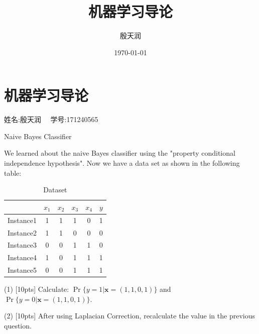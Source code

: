 \documentclass[11pt, a4paper, UTF8]{ctexart}
\title{机器学习导论}
\author{殷天润}
\date{\today}
\begin{document}
                                                                                                                

\section {机器学习导论}

\begin{center} 姓名:殷天润 ~~学号:171240565\end{center}
\begin{problem}[ML problem 1]
	[20pts] Naive Bayes Classifier

		
	We learned about the naive Bayes classifier using the "property conditional independence hypothesis". Now we have a data set as shown in the following table:
	\begin{table}[htp]
		\centering
		\caption{Dataset}\label{tab:aStrangeTable}
	\begin{tabular}{c|ccccc}
		\hline 
		& $x_1$ & $x_2$ & $x_3$ & $x_4$ & $y$ \\ 
		\hline 
	Instance1	& 1 & 1 & 1 & 0 & 1 \\ 
		\hline 
	Instance2	& 1 & 1 & 0 & 0 & 0 \\ 
		\hline 
	Instance3	& 0 & 0 & 1 & 1 & 0 \\ 
		\hline 
	Instance4	& 1 & 0 & 1 & 1 & 1 \\ 
		\hline 
	Instance5	& 0 & 0 & 1 & 1 & 1 \\ 
		\hline 
	\end{tabular}
	\end{table} 
	

		(1) [10pts]  Calculate: $\Pr\{ y=1 | \mathbf{x}=(1,1,0,1) \}$ and $\Pr\{ y=0 | \mathbf{x}=(1,1,0,1) \}$.
		
		(2) [10pts] After using Laplacian Correction, recalculate the value in the previous question.
		
\end{problem}
\end{document}
